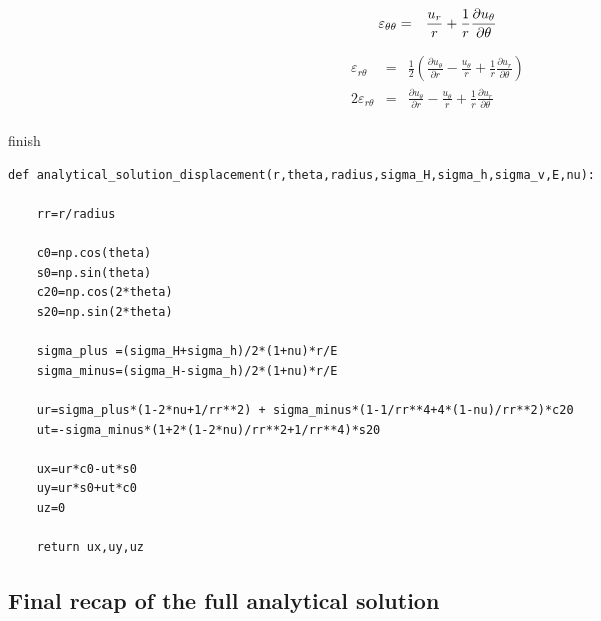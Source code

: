 \begin{eqnarray}
\varepsilon_{\theta\theta} 
&=& \frac{u_r}{r} + \frac{1}{r} \frac{\partial u_\theta}{\partial \theta} \nonumber\\
\end{eqnarray}


\begin{eqnarray}
\varepsilon_{r \theta} 
&=& \frac12 \left(  
\frac{\partial u_\theta}{\partial r} - \frac{u_\theta}{r} 
+ \frac1r \frac{\partial u_r}{\partial \theta}
\right)
\\
2\varepsilon_{r \theta} 
&=& 
\frac{\partial u_\theta}{\partial r} - \frac{u_\theta}{r} 
+ \frac1r \frac{\partial u_r}{\partial \theta}
\\
\end{eqnarray}


















{\color{red} finish}

\begin{lstlisting}
def analytical_solution_displacement(r,theta,radius,sigma_H,sigma_h,sigma_v,E,nu):

    rr=r/radius

    c0=np.cos(theta)
    s0=np.sin(theta)
    c20=np.cos(2*theta)
    s20=np.sin(2*theta)

    sigma_plus =(sigma_H+sigma_h)/2*(1+nu)*r/E
    sigma_minus=(sigma_H-sigma_h)/2*(1+nu)*r/E

    ur=sigma_plus*(1-2*nu+1/rr**2) + sigma_minus*(1-1/rr**4+4*(1-nu)/rr**2)*c20
    ut=-sigma_minus*(1+2*(1-2*nu)/rr**2+1/rr**4)*s20

    ux=ur*c0-ut*s0
    uy=ur*s0+ut*c0
    uz=0

    return ux,uy,uz
\end{lstlisting}



\newpage
\subsection*{Final recap of the full analytical solution}

